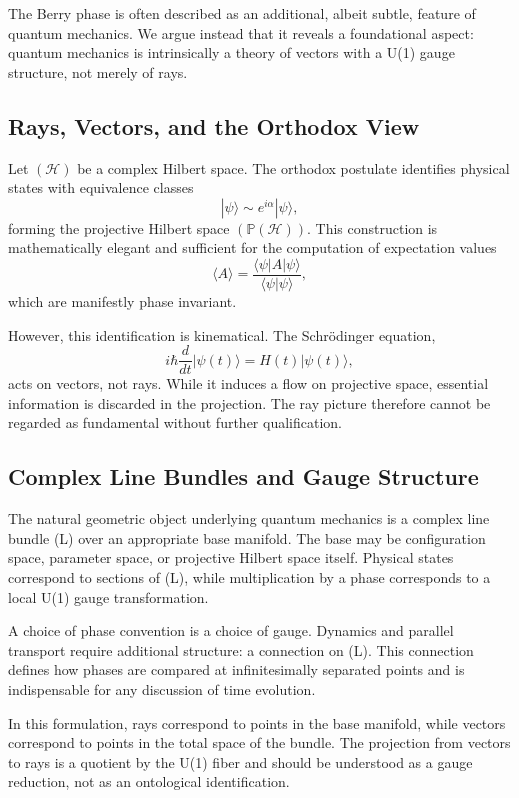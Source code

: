 \documentclass[11pt]{article}
\begin{document}
The Berry phase is often described as an additional, albeit subtle, 
feature of quantum mechanics. We argue instead that it reveals a
foundational aspect: quantum mechanics is intrinsically a theory of vectors
with a U(1) gauge structure, not merely of rays. 

\subsection{ Rays, Vectors, and the Orthodox View}

Let $(\mathcal H)$ be a complex Hilbert space. The orthodox postulate
identifies physical states with equivalence classes
\[
|\psi\rangle \sim e^{i\alpha}|\psi\rangle,
\]
forming the projective Hilbert space $(\mathbb P(\mathcal H))$. This
construction is mathematically elegant and sufficient for the computation 
of expectation values
\[
\langle A \rangle = \frac{\langle \psi | A | \psi \rangle}{\langle \psi | \psi \rangle},
\]
which are manifestly phase invariant.

However, this identification is kinematical. The Schrödinger equation,
\[
i\hbar \frac{d}{dt}|\psi(t)\rangle = H(t)|\psi(t)\rangle,
\]
acts on vectors, not rays. While it induces a flow on projective space,
essential information is discarded in the projection. The ray picture
therefore cannot be regarded as fundamental without further qualification.

\subsection{Complex Line Bundles and Gauge Structure}

The natural geometric object underlying quantum mechanics is a complex line
bundle (L) over an appropriate base manifold. The base may be configuration
space, parameter space, or projective Hilbert space itself. Physical states
correspond to sections of (L), while multiplication by a phase corresponds
to a local U(1) gauge transformation.

A choice of phase convention is a choice of gauge. Dynamics and parallel
transport require additional structure: a connection on (L). This
connection defines how phases are compared at infinitesimally separated
points and is indispensable for any discussion of time evolution.

In this formulation, rays correspond to points in the base manifold, 
while vectors correspond to points in the total space of the bundle. 
The projection from vectors to rays is a quotient by the U(1) fiber 
and should be understood as a gauge reduction, not as an ontological
identification.
\end{document}
